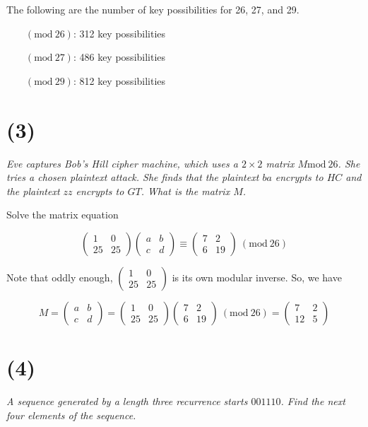 \documentclass[12pt]{article}
\renewcommand{\mod}[1]{\mathrm{mod}\ #1}
\renewcommand{\pmod}[1]{\ (\mod{#1})}
\begin{document}
The following are the number of key possibilities for 26, 27, and 29.

\begin{itemize}
  \item[$\pmod{26}$:] 312 key possibilities
  \item[$\pmod{27}$:] 486 key possibilities
  \item[$\pmod{29}$:] 812 key possibilities
\end{itemize}

\section*{(3)} \textit{Eve captures Bob’s Hill cipher machine, which uses a $2\times2$ matrix $M \mod{26}$. She tries a chosen plaintext attack. She finds that the plaintext $ba$ encrypts to $HC$ and the plaintext $zz$ encrypts to $GT$. What is the matrix $M$.}

Solve the matrix equation

$$\begin{pmatrix}1 & 0\\25 & 25\end{pmatrix}\begin{pmatrix}a & b\\c & d\end{pmatrix} \equiv \begin{pmatrix}7 & 2\\6 & 19\end{pmatrix} \pmod{26}$$

Note that oddly enough, $\begin{pmatrix}1 & 0\\25 & 25\end{pmatrix}$ is its own modular inverse. So, we have

$$M = \begin{pmatrix}a & b\\c & d\end{pmatrix} = \begin{pmatrix}1 & 0\\25 & 25\end{pmatrix}\begin{pmatrix}7 & 2\\6 & 19\end{pmatrix} \pmod{26} = \begin{pmatrix}7 & 2\\12 & 5\end{pmatrix}$$

\section*{(4)} \textit{A sequence generated by a length three recurrence starts $001110$. Find the next four elements of the sequence.}
\end{document}
